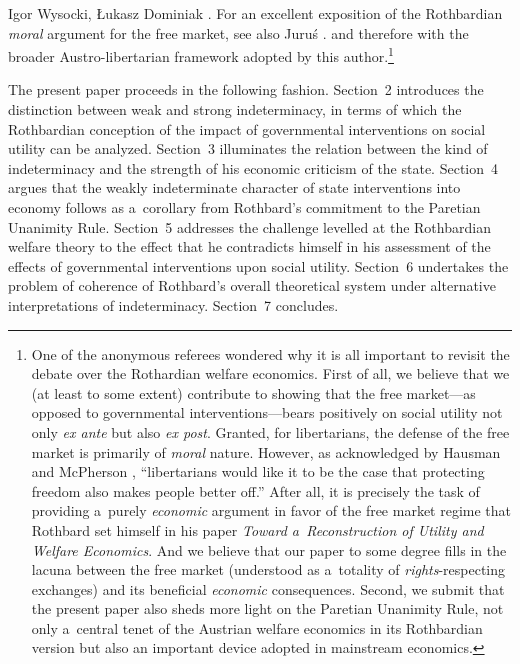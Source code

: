 \begin{artengenv}{Igor Wysocki, Łukasz Dominiak}
{%
\parencites*[][]{rothbard_for_2006}[][]{rothbard_man_2009}[][]{rothbard_ethics_2002}. %
 For an excellent exposition of the Rothbardian \textit{moral} argument for the free market, see also Juruś 
\parencite*[][]{jurus_w_2012}. %
 } and therefore with the broader Austro-libertarian framework adopted by this author.\footnote{One of the anonymous referees wondered why it is all important to revisit the debate over the Rothardian welfare economics. First of all, we believe that we (at least to some extent) contribute to showing that the free market---as opposed to governmental interventions---bears positively on social utility not only \textit{ex ante} but also \textit{ex post}. Granted, for libertarians, the defense of the free market is primarily of \textit{moral} nature. However, as acknowledged by Hausman and McPherson 
\parencite*[][p.172]{hausman_economic_2006}, %
 ``libertarians would like it to be the case that protecting freedom also makes people better off.'' After all, it is precisely the task of providing a~purely \textit{economic} argument in favor of the free market regime that Rothbard set himself in his paper \textit{Toward a~Reconstruction of Utility and Welfare Economics}. And we believe that our paper to some degree fills in the lacuna between the free market (understood as a~totality of \textit{rights}{-respecting exchanges) and its beneficial }\textit{economic} consequences. Second, we submit that the present paper also sheds more light on the Paretian Unanimity Rule, not only a~central tenet of the Austrian welfare economics in its Rothbardian version but also an important device adopted in mainstream economics. }



The present paper proceeds in the following fashion. Section~2 introduces the distinction between weak and strong indeterminacy, in terms of which the Rothbardian conception of the impact of governmental interventions on social utility can be analyzed. Section~3 illuminates the relation between the kind of indeterminacy and the strength of his economic criticism of the state. Section~4 argues that the weakly indeterminate character of state interventions into economy follows as a~corollary from Rothbard's commitment to the Paretian Unanimity Rule. Section~5 addresses the challenge levelled at the Rothbardian welfare theory to the effect that he contradicts himself in his assessment of the effects of governmental interventions upon social utility. Section~6 undertakes the problem of coherence of Rothbard's overall theoretical system under alternative interpretations of indeterminacy. Section~7 concludes.




\end{artengenv}
